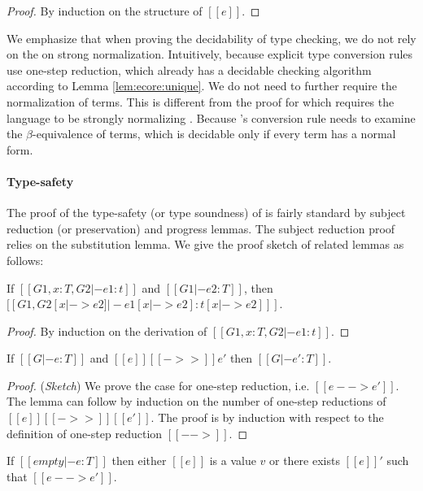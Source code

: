 \begin{proof}
	By induction on the structure of $[[e]]$.
\end{proof}

We emphasize that when proving the decidability of type checking, we do not rely on the
on strong normalization. Intuitively, because explicit type conversion rules use one-step
reduction, which already has a decidable checking algorithm according to Lemma
\ref{lem:ecore:unique}. We do not need to further require the normalization of
terms. This is different from the proof for \cc which requires the
language to be strongly
normalizing \cite{pts:normalize}. Because \cc's conversion rule needs to
examine the $\beta$-equivalence of terms, which is decidable only if every term
has a normal form.

\paragraph{Type-safety}
The proof of the type-safety (or type soundness) of \ecore is fairly standard by subject
reduction (or preservation) and progress lemmas. The subject reduction proof
relies on the substitution lemma. We give the proof sketch of related lemmas as
follows:

\begin{lem}[Substitution]\label{lem:ecore:subst}
	If $[[G1, x:T, G2 |- e1:t]]$ and $[[G1 |- e2:T]]$, then $[[G1, G2 [x |-> e2]
|- e1[x |-> e2]  : t[x |-> e2] ]]$.
\end{lem}

\begin{proof}
    By induction on the derivation of $[[G1, x:T, G2 |- e1:t]]$.
\end{proof}

\begin{thm}\label{lem:ecore:reduct}
If $[[G |- e:T]]$ and $[[e]] [[->>]] e'$ then $[[G |- e':T]]$.
\end{thm}

\begin{proof}
    (\emph{Sketch}) We prove the case for one-step reduction, i.e. $[[e -->
e']]$. The lemma can follow by induction on the number of one-step reductions
of $[[e]] [[->>]] [[e']]$.
    The proof is by induction with respect to the definition of one-step
reduction $[[-->]]$.
\end{proof}

\begin{thm}[Progress]\label{lem:ecore:prog}
If $[[empty |- e:T]]$ then either $[[e]]$ is a value $v$ or there exists $[[e]]'$
such that $[[e --> e']]$.
\end{thm}

